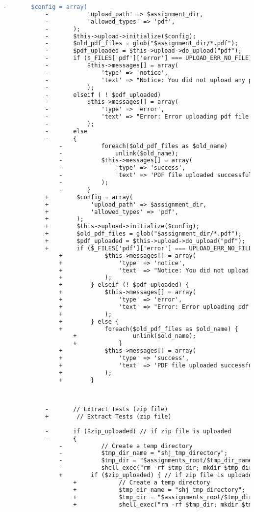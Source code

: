 \begin{lstlisting}[language=diff, caption=Perubahan pada kode Assignments.php]
			-		$config = array(
			-			'upload_path' => $assignment_dir,
			-			'allowed_types' => 'pdf',
			-		);
			-		$this->upload->initialize($config);
			-		$old_pdf_files = glob("$assignment_dir/*.pdf");
			-		$pdf_uploaded = $this->upload->do_upload("pdf");
			-		if ($_FILES['pdf']['error'] === UPLOAD_ERR_NO_FILE)
			-			$this->messages[] = array(
			-				'type' => 'notice',
			-				'text' => "Notice: You did not upload any pdf file for assignment. If needed, upload by editing assignment."
			-			);
			-		elseif ( ! $pdf_uploaded)
			-			$this->messages[] = array(
			-				'type' => 'error',
			-				'text' => "Error: Error uploading pdf file of assignment: ".$this->upload->display_errors('', '')
			-			);
			-		else
			-		{
				-			foreach($old_pdf_files as $old_name)
				-				unlink($old_name);
				-			$this->messages[] = array(
				-				'type' => 'success',
				-				'text' => 'PDF file uploaded successfully.'
				-			);
				-		}
			+        $config = array(
			+            'upload_path' => $assignment_dir,
			+            'allowed_types' => 'pdf',
			+        );
			+        $this->upload->initialize($config);
			+        $old_pdf_files = glob("$assignment_dir/*.pdf");
			+        $pdf_uploaded = $this->upload->do_upload("pdf");
			+        if ($_FILES['pdf']['error'] === UPLOAD_ERR_NO_FILE) {
				+            $this->messages[] = array(
				+                'type' => 'notice',
				+                'text' => "Notice: You did not upload any pdf file for assignment. If needed, upload by editing assignment."
				+            );
				+        } elseif (! $pdf_uploaded) {
				+            $this->messages[] = array(
				+                'type' => 'error',
				+                'text' => "Error: Error uploading pdf file of assignment: ".$this->upload->display_errors('', '')
				+            );
				+        } else {
				+            foreach($old_pdf_files as $old_name) {
					+                unlink($old_name);
					+            }
				+            $this->messages[] = array(
				+                'type' => 'success',
				+                'text' => 'PDF file uploaded successfully.'
				+            );
				+        }
			
			
			
			-		// Extract Tests (zip file)
			+        // Extract Tests (zip file)
			
			-		if ($zip_uploaded) // if zip file is uploaded
			-		{
				-			// Create a temp directory
				-			$tmp_dir_name = "shj_tmp_directory";
				-			$tmp_dir = "$assignments_root/$tmp_dir_name";
				-			shell_exec("rm -rf $tmp_dir; mkdir $tmp_dir;");
				+        if ($zip_uploaded) { // if zip file is uploaded
					+            // Create a temp directory
					+            $tmp_dir_name = "shj_tmp_directory";
					+            $tmp_dir = "$assignments_root/$tmp_dir_name";
					+            shell_exec("rm -rf $tmp_dir; mkdir $tmp_dir;");
					

\end{lstlisting}
